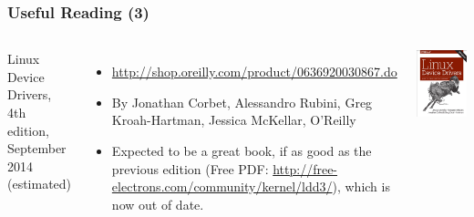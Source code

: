 \begin{frame}
  \frametitle{Useful Reading (3)}
  \begin{columns}
    Linux Device Drivers, 4th edition, September 2014 (estimated)
    \begin{itemize}
    \item \url{http://shop.oreilly.com/product/0636920030867.do}
    \item By Jonathan Corbet, Alessandro Rubini, Greg Kroah-Hartman,
      Jessica McKellar, O'Reilly
    \item Expected to be a great book, if as good as the previous
      edition (Free PDF: \url{http://free-electrons.com/community/kernel/ldd3/}),
      which is now out of date.
    \end{itemize}
    \includegraphics[width=\textwidth]{slides/kernel-resources-references/linux-device-drivers4.jpg}
  \end{columns}
\end{frame}

